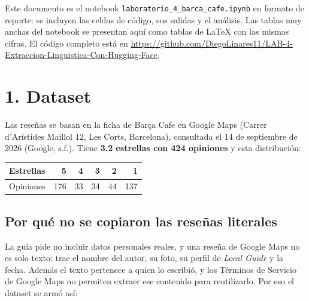 \documentclass[12pt,a4paper]{article}
\begin{document}
Este documento es el notebook \texttt{laboratorio\_4\_barca\_cafe.ipynb} en formato de reporte:
se incluyen las celdas de código, sus salidas y el análisis. Las tablas muy anchas del notebook se
presentan aquí como tablas de \LaTeX{} con las mismas cifras. El código completo está en
\url{https://github.com/DiegoLinares11/LAB-4-Extraccion-Linguistica-Con-Hugging-Face}.


\section{1. Dataset}

Las reseñas se basan en la ficha de Barça Cafe en Google Maps (Carrer d'Arístides Maillol 12,
Les Corts, Barcelona), consultada el 14 de septiembre de 2026 (Google, s.f.). Tiene
\textbf{3.2 estrellas con 424 opiniones} y esta distribución:

\begin{center}
\renewcommand{\arraystretch}{1.4}
\begin{tabular}{|l|r|r|r|r|r|}
\hline
\textbf{Estrellas} & \textbf{5} & \textbf{4} & \textbf{3} & \textbf{2} & \textbf{1} \\
\hline
Opiniones & 176 & 33 & 34 & 44 & 137 \\
\hline
\end{tabular}
\end{center}

\subsection{Por qué no se copiaron las reseñas literales}

La guía pide no incluir datos personales reales, y una reseña de Google Maps no es solo texto:
trae el nombre del autor, su foto, su perfil de \emph{Local Guide} y la fecha. Además el texto
pertenece a quien lo escribió, y los Términos de Servicio de Google Maps no permiten extraer ese
contenido para reutilizarlo. Por eso el dataset se armó así:
\end{document}
